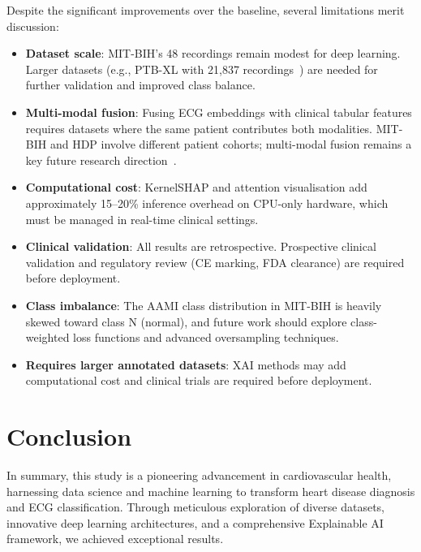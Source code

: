\documentclass[10pt, twocolumn]{article}
\begin{document}
Despite the significant improvements over the baseline, several limitations merit discussion:

\begin{itemize}[leftmargin=*]
  \item \textbf{Dataset scale}: MIT-BIH's 48 recordings remain modest for deep learning.
        Larger datasets (e.g., PTB-XL with 21,837 recordings~\cite{wagner2020}) are needed
        for further validation and improved class balance.
  \item \textbf{Multi-modal fusion}: Fusing ECG embeddings with clinical tabular features
        requires datasets where the same patient contributes both modalities.
        MIT-BIH and HDP involve different patient cohorts; multi-modal fusion remains a
        key future research direction~\cite{alfaidil2022}.
  \item \textbf{Computational cost}: KernelSHAP and attention visualisation add
        approximately 15--20\% inference overhead on CPU-only hardware, which must be
        managed in real-time clinical settings.
  \item \textbf{Clinical validation}: All results are retrospective.
        Prospective clinical validation and regulatory review (CE marking, FDA clearance)
        are required before deployment.
  \item \textbf{Class imbalance}: The AAMI class distribution in MIT-BIH is heavily
        skewed toward class N (normal), and future work should explore class-weighted
        loss functions and advanced oversampling techniques.
  \item \textbf{Requires larger annotated datasets}: XAI methods may add computational
        cost and clinical trials are required before deployment.
\end{itemize}

\section{Conclusion}

In summary, this study is a pioneering advancement in cardiovascular health, harnessing
data science and machine learning to transform heart disease diagnosis and ECG classification.
Through meticulous exploration of diverse datasets, innovative deep learning architectures,
and a comprehensive Explainable AI framework, we achieved exceptional results.
\end{document}
